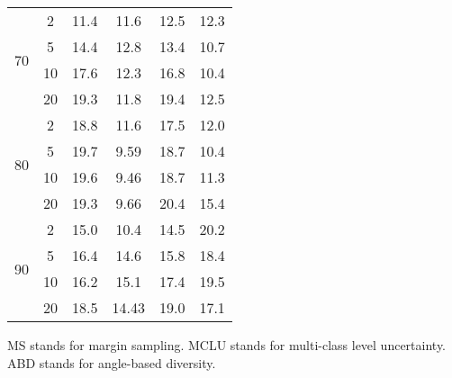 \begin{table}[ht!]
\begin{threeparttable}
\begin{tabular}{ |c| c|c|c|c| c| }
\multirow{4}{*}{70}             &    2              & 11.4        & 11.6       & 12.5             &  12.3                  \\ 
 \cline{2-6}
                                            &    5               & 14.4       &12.8         & 13.4            &   10.7 \\
\cline{2-6}
                                            &    10             & 17.6        & 12.3        & 16.8            &  10.4 \\
\cline{2-6}
                                            &    20             & 19.3       & 11.8        & 19.4             &   12.5    \\
\hline

\multirow{4}{*}{80}             &    2              &18.8         &11.6        & 17.5                 &  12.0                   \\ 
 \cline{2-6}
                                            &    5               &19.7         &  9.59      & 18.7                 &  10.4\\
\cline{2-6}
                                            &    10            &  19.6      &   9.46        & 18.7                & 11.3\\
\cline{2-6}
                                            &    20            &   19.3      &  9.66        & 20.4                & 15.4  \\
\hline

\multirow{4}{*}{90}             &    2              & 15.0        & 10.4       &    14.5        &   20.2                 \\ 
 \cline{2-6}
                                            &    5              &  16.4        & 14.6       &  15.8         &  18.4   \\
\cline{2-6}
                                            &    10            & 16.2        & 15.1        & 17.4          &  19.5  \\
\cline{2-6}
                                            &    20            &  18.5       & 14.43        & 19.0          &  17.1 \\
\hline
\end{tabular}
 \begin{tablenotes}
      \small
      \item MS stands for margin sampling. MCLU stands for  multi-class level uncertainty. ABD stands for angle-based diversity.
    \end{tablenotes}    
  \end{threeparttable} 
\label{tab:AL_different_conditions}   
\end{table} 


